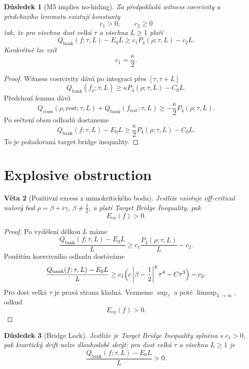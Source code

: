 \documentclass[11pt,a4paper]{article}
\newtheorem{theorem}{Věta}[section]
\newtheorem{corollary}[theorem]{Důsledek}
\begin{document}
\begin{corollary}[M5 implies no-hiding]
Za předpokladů witness coercivity a předchozího lemmatu existují konstanty
\[
c_1>0,\qquad c_2\ge 0
\]
tak, že pro všechna dost velká \(\tau\) a všechna \(L\ge 1\) platí
\[
Q_{\mathrm{bank}}(f;\tau,L)-E_0L
\ge
c_1P_4(\rho;\tau,L)-c_2L.
\]
Konkrétně lze vzít
\[
c_1=\frac{\kappa}{2}.
\]
\end{corollary}

\begin{proof}
Witness coercivity dává po integraci přes \([\tau,\tau+L]\)
\[
Q_{\mathrm{bank}}(f_\rho;\tau,L)\ge \kappa P_4(\rho;\tau,L)-C_0L.
\]
Předchozí lemma dává
\[
Q_{\mathrm{cross}}(\rho,\mathrm{rest};\tau,L)
+
Q_{\mathrm{bank}}(f_{\mathrm{rest}};\tau,L)
\ge
-\frac{\kappa}{2}P_4(\rho;\tau,L).
\]
Po sečtení obou odhadů dostaneme
\[
Q_{\mathrm{bank}}(f;\tau,L)-E_0L
\ge
\frac{\kappa}{2}P_4(\rho;\tau,L)-C_0L.
\]
To je požadovaná target bridge inequality.
\end{proof}



\section{Explosive obstruction}

\begin{theorem}[Pozitivní excess z mimokritického bodu]
Jestliže existuje off-critical nulový bod \(\rho=\beta+i\gamma\), \(\beta\neq \frac12\), a platí
Target Bridge Inequality, pak
\[
E_{\mathrm{ex}}(f)>0.
\]
\end{theorem}

\begin{proof}
Po vydělení délkou \(L\) máme
\[
\frac{Q_{\mathrm{bank}}(f;\tau,L)-E_0L}{L}
\ge
c_1\frac{P_4(\rho;\tau,L)}{L}-c_2.
\]
Použitím koercivního odhadu dostáváme
\[
\frac{Q_{\mathrm{bank}}(f;\tau,L)-E_0L}{L}
\ge
c_1\Bigl(c\left|\beta-\frac12\right|^4\tau^4-C\tau^3\Bigr)-c_2.
\]
Pro dost velká \(\tau\) je pravá strana kladná. Vezmeme \(\sup_\tau\) a poté \(\limsup_{L\to\infty}\),
odkud
\[
E_{\mathrm{ex}}(f)>0.
\]
\end{proof}

\begin{corollary}[Bridge Lock]
Jestliže je Target Bridge Inequality splněna s \(c_1>0\), pak kvartický drift nelze dlouhodobě
skrýt: pro dost velká \(\tau\) a všechna \(L\ge 1\) je
\[
\frac{Q_{\mathrm{bank}}(f;\tau,L)-E_0L}{L}>0.
\]
\end{corollary}
\end{document}
